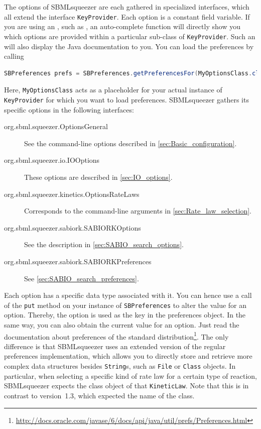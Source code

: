 The options of SBMLsqueezer are each gathered in specialized interfaces, which all extend the interface \texttt{KeyProvider}.
Each option is a constant field variable.
If you are using an \IDE, such as \Eclipse, an auto-complete function will directly show you which options are provided within a particular sub-class of \texttt{KeyProvider}.
Such an \IDE will also display the Java documentation to you.
You can load the preferences by calling
\begin{lstlisting}[language=Java, numbers=none, caption={Loading preferences in SBMLsqueezer 2}]
SBPreferences prefs = SBPreferences.getPreferencesFor(MyOptionsClass.class);
\end{lstlisting}
Here, \texttt{MyOptionsClass} acts as a placeholder for your actual instance of \texttt{KeyProvider} for which you want to load preferences.
SBMLsqueezer gathers its specific options in the following interfaces:
\renewcommand{\descriptionlabel}[1]{\textcolor{blue}{\texttt{#1}}}
\begin{description}
  \item[org.sbml.squeezer.OptionsGeneral] See the command-line options described in \vref{sec:Basic_configuration}.
  \item[org.sbml.squeezer.io.IOOptions] These options are described in \vref{sec:IO_options}.
  \item[org.sbml.squeezer.kinetics.OptionsRateLaws] Corresponds to the command-line arguments in \vref{sec:Rate_law_selection}.
  \item[org.sbml.squeezer.sabiork.SABIORKOptions] See the description in \vref{sec:SABIO_search_options}.
  \item[org.sbml.squeezer.sabiork.SABIORKPreferences] See \vref{sec:SABIO_search_preferences}.
\end{description}
Each option has a specific data type associated with it.
You can hence use a call of the \texttt{put} method on your instance of \texttt{SBPreferences} to alter the value
for an option.
Thereby, the option is used as the key in the preferences object.
In the same way, you can also obtain the current value for an option.
Just read the documentation about preferences of the standard \Java distribution\footnote{\url{http://docs.oracle.com/javase/6/docs/api/java/util/prefs/Preferences.html}}.
The only difference is that SBMLsqueezer uses an extended version of the regular preferences implementation, which allows you to directly store and retrieve more complex data structures besides \texttt{String}s, such as \texttt{File} or \texttt{Class} objects.
In particular, when selecting a specific kind of rate law for a certain type of reaction, SBMLsqueezer expects the class object of that \texttt{KineticLaw}.
Note that this is in contrast to version~1.3, which expected the name of the class.

